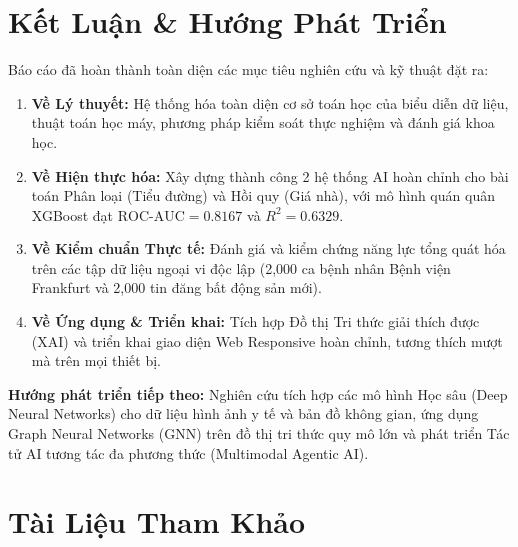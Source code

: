 \documentclass[12pt,a4paper]{report}
\begin{document}
\newpage

\chapter*{Kết Luận \& Hướng Phát Triển}

Báo cáo đã hoàn thành toàn diện các mục tiêu nghiên cứu và kỹ thuật đặt ra:
\begin{enumerate}[leftmargin=1.5em]
    \item \textbf{Về Lý thuyết:} Hệ thống hóa toàn diện cơ sở toán học của biểu diễn dữ liệu, thuật toán học máy, phương pháp kiểm soát thực nghiệm và đánh giá khoa học.
    \item \textbf{Về Hiện thực hóa:} Xây dựng thành công 2 hệ thống AI hoàn chỉnh cho bài toán Phân loại (Tiểu đường) và Hồi quy (Giá nhà), với mô hình quán quân XGBoost đạt $\text{ROC-AUC} = 0.8167$ và $R^2 = 0.6329$.
    \item \textbf{Về Kiểm chuẩn Thực tế:} Đánh giá và kiểm chứng năng lực tổng quát hóa trên các tập dữ liệu ngoại vi độc lập (2,000 ca bệnh nhân Bệnh viện Frankfurt và 2,000 tin đăng bất động sản mới).
    \item \textbf{Về Ứng dụng \& Triển khai:} Tích hợp Đồ thị Tri thức giải thích được (XAI) và triển khai giao diện Web Responsive hoàn chỉnh, tương thích mượt mà trên mọi thiết bị.
\end{enumerate}

\textbf{Hướng phát triển tiếp theo:}
Nghiên cứu tích hợp các mô hình Học sâu (Deep Neural Networks) cho dữ liệu hình ảnh y tế và bản đồ không gian, ứng dụng Graph Neural Networks (GNN) trên đồ thị tri thức quy mô lớn và phát triển Tác tử AI tương tác đa phương thức (Multimodal Agentic AI).

\chapter*{Tài Liệu Tham Khảo}
\end{document}
